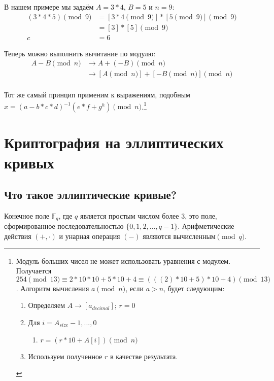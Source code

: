 В нашем примере мы задаём $A = 3*4$, $B = 5$ и $n = 9$:\vspace{.175cm}
\begin{align*}
(3*4 * 5) \pmod{9} &= {[3*4 \pmod {9}] * [5 \pmod{9}]} \pmod{9} \\
				   &= [3]*[5] \pmod 9 \\
				 c &= 6
\end{align*}

Теперь можно выполнить вычитание по модулю:\vspace{.175cm}
\begin{align*}
A - B \pmod n &\rightarrow A + (-B) \pmod n \\
			  &\rightarrow {[A \pmod {n}] + [-B \pmod{n}]} \pmod{n}
\end{align*}\\

Тот же самый принцип применим к выражениям, подобным $x = (a-b*c*d)^{-1} (e*f+g^{h}) \pmod n$.\footnote{Модуль больших чисел не может использовать уравнения с модулем. Получается $254 \pmod {13} \equiv 2*10*10 + 5*10 + 4 \equiv (((2)*10 + 5)*10 + 4) \pmod {13}$. Алгоритм вычисления $a \pmod n$, если $a > n$, будет следующим:
\begin{enumerate}
	\item Определяем $A \rightarrow [a_{decimal}]$; $r = 0$
	\item Для $i = A_{size} - 1,...,0$
	\begin{enumerate}
		\item $r = (r*10 + A[i]) \pmod n$
	\end{enumerate}
	\item Используем полученное $r$ в качестве результата.
\end{enumerate}}



\section{Криптография на эллиптических кривых}
\label{EllipticCurveCryptography}


\subsection{Что такое эллиптические кривые?}
\label{elliptic_curves_section}

 Конечное поле \(\mathbb{F}_q\), где \(q\) является простым числом более 3, это поле, сформированное последо\-вательностью \(\{0, 1, 2, ..., q-1\}\). Арифметические действия \((+,  \cdot)\) и унарная операция $(-)$ являются вычисленным\( \pmod q\).


